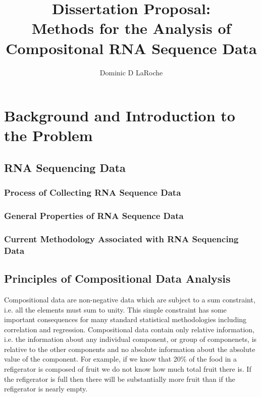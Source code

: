 \documentclass{book}\usepackage[]{graphicx}\usepackage[]{color}
\title{Dissertation Proposal:\\ Methods for the Analysis of Compositonal RNA Sequence Data}
\author{Dominic D LaRoche}
\begin{document}
\maketitle
\tableofcontents

\chapter{Background and Introduction to the Problem}

\section{RNA Sequencing Data}
\subsection{Process of Collecting RNA Sequence Data}

\subsection{General Properties of RNA Sequence Data}


\subsection{Current Methodology Associated with RNA Sequencing Data}


\section{Principles of Compositional Data Analysis}
Compositional data are non-negative data which are subject to a sum constraint, i.e. all the elements must sum to unity.  This simple constraint has some important consequences for many standard statistical methodologies including correlation and regression.  Compositional data contain only relative information, i.e. the information about any individual component, or group of componenets, is relative to the other components and no absolute information about the absolute value of the component.  For example, if we know that 20\% of the food in a refigerator is composed of fruit we do not know how much total fruit there is.  If the refigerator is full then there will be substantially more fruit than if the refigerator is nearly empty.\\
\end{document}
